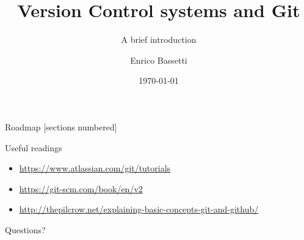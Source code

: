 \documentclass[10pt]{beamer}
\title{Version Control systems and Git}
\subtitle{A brief introduction}
\date{\today}
\author{Enrico Bassetti}
\institute{Sapienza - University of Rome}
\begin{document}

\maketitle

\begin{frame}{Roadmap}
  [sections numbered]
  \tableofcontents[hideallsubsections]
\end{frame}





\begin{frame}{Useful readings}

\begin{itemize}
  \item \url{https://www.atlassian.com/git/tutorials}
  \item \url{https://git-scm.com/book/en/v2}
  \item \url{http://thepilcrow.net/explaining-basic-concepts-git-and-github/}
\end{itemize}

\end{frame}

\begin{frame}[standout]
  Questions?
\end{frame}

\begin{frame}{}

  \begin{center}\ccbysa\end{center}

\end{frame}
\end{document}
